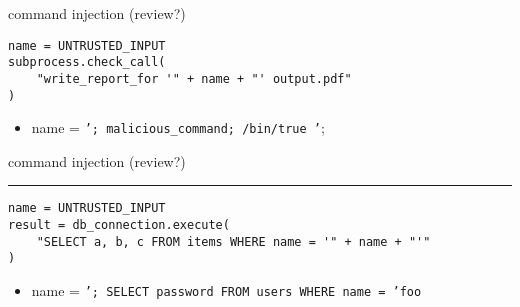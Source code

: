 \begin{frame}[fragile]{command injection (review?)}
\begin{Verbatim}[fontsize=\small]
name = UNTRUSTED_INPUT
subprocess.check_call(
    "write_report_for '" + name + "' output.pdf"
)
\end{Verbatim}
\begin{itemize}
\item name = \texttt{'; malicious\_command; /bin/true '};
\end{itemize}
\end{frame}

\begin{frame}[fragile]{command injection (review?)}
\hrule
\begin{Verbatim}[fontsize=\small]
name = UNTRUSTED_INPUT
result = db_connection.execute(
    "SELECT a, b, c FROM items WHERE name = '" + name + "'"
)
\end{Verbatim}
\begin{itemize}
\item name = \texttt{'; SELECT password FROM users WHERE name = 'foo}
\end{itemize}
\end{frame}

